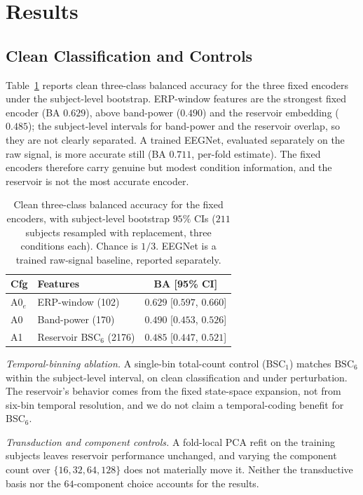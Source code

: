 \documentclass[conference]{IEEEtran}
\newcommand{\BSC}{\ensuremath{\mathrm{BSC}_{6}}}
\begin{document}
\section{Results}
\subsection{Clean Classification and Controls}
\label{sec:clean}
Table~\ref{tab:clean} reports clean three-class balanced accuracy for the three fixed encoders under the subject-level bootstrap. ERP-window features are the strongest fixed encoder (BA $0.629$), above band-power ($0.490$) and the reservoir embedding ($0.485$); the subject-level intervals for band-power and the reservoir overlap, so they are not clearly separated. A trained EEGNet, evaluated separately on the raw signal, is more accurate still (BA $0.711$, per-fold estimate). The fixed encoders therefore carry genuine but modest condition information, and the reservoir is not the most accurate encoder.


\begin{table}[t]
\caption{Clean three-class balanced accuracy for the fixed encoders, with subject-level bootstrap $95\%$ CIs ($211$ subjects resampled with replacement, three conditions each). Chance is $1/3$. EEGNet is a trained raw-signal baseline, reported separately.}
\label{tab:clean}
\centering
\small
\setlength{\tabcolsep}{4pt}
\begin{tabular}{llc}
\toprule
Cfg & Features & BA [95\% CI] \\
\midrule
A0$_e$ & ERP-window (102) & $0.629$ [$0.597$, $0.660$] \\
A0 & Band-power (170) & $0.490$ [$0.453$, $0.526$] \\
A1 & Reservoir \BSC{} (2176) & $0.485$ [$0.447$, $0.521$] \\
\bottomrule
\end{tabular}
\end{table}

\emph{Temporal-binning ablation.} A single-bin total-count control (BSC$_1$) matches \BSC{} within the subject-level interval, on clean classification and under perturbation. The reservoir's behavior comes from the fixed state-space expansion, not from six-bin temporal resolution, and we do not claim a temporal-coding benefit for BSC$_6$.

\emph{Transduction and component controls.} A fold-local PCA refit on the training subjects leaves reservoir performance unchanged, and varying the component count over $\{16,32,64,128\}$ does not materially move it. Neither the transductive basis nor the $64$-component choice accounts for the results.
\end{document}
